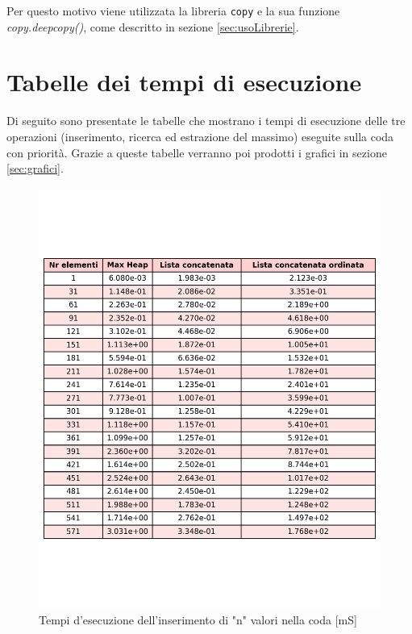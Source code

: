 \documentclass{article}
\begin{document}
Per questo motivo viene utilizzata la libreria \verb|copy| e la sua funzione \textit{copy.deepcopy()}, come descritto in sezione \ref{sec:usoLibrerie}.

\clearpage

\section{Tabelle dei tempi di esecuzione}

\label{sec:tabelleTempi}

Di seguito sono presentate le tabelle che mostrano i tempi di esecuzione delle tre operazioni (inserimento, ricerca ed estrazione del massimo) eseguite sulla coda con priorità. Grazie a queste tabelle verranno poi prodotti i grafici in sezione \ref{sec:grafici}.

\begin{figure}[H]
    \centering
    \includegraphics[scale=0.8]{Images/TempoInserimento.png}
    \caption{Tempi d'esecuzione dell'inserimento di "n" valori nella coda [mS]}
    \label{fig:TabellaInserimento}
\end{figure}
\end{document}

